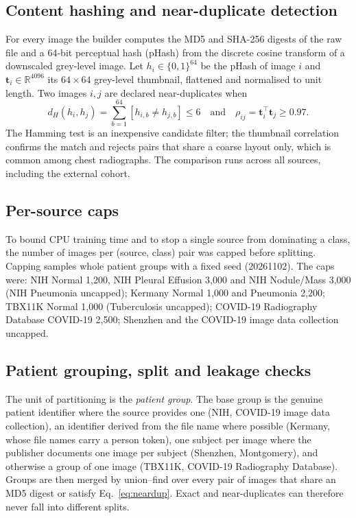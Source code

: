 \subsection{Content hashing and near-duplicate detection}
\label{sec:hashing}
For every image the builder computes the MD5 and SHA-256 digests of the raw file and a 64-bit perceptual hash (pHash) from the discrete cosine transform of a downscaled grey-level image. Let $h_i\in\{0,1\}^{64}$ be the pHash of image $i$ and $\mathbf{t}_i\in\mathbb{R}^{4096}$ its $64\times64$ grey-level thumbnail, flattened and normalised to unit length. Two images $i,j$ are declared near-duplicates when
\begin{equation}
d_H(h_i,h_j)=\sum_{b=1}^{64}\left[h_{i,b}\neq h_{j,b}\right]\le 6
\quad\text{and}\quad
\rho_{ij}=\mathbf{t}_i^{\top}\mathbf{t}_j\ge 0.97 .
\label{eq:neardup}
\end{equation}
The Hamming test is an inexpensive candidate filter; the thumbnail correlation confirms the match and rejects pairs that share a coarse layout only, which is common among chest radiographs. The comparison runs across all sources, including the external cohort.

\subsection{Per-source caps}
To bound CPU training time and to stop a single source from dominating a class, the number of images per (source, class) pair was capped before splitting. Capping samples whole patient groups with a fixed seed (20261102). The caps were: NIH Normal 1,200, NIH Pleural Effusion 3,000 and NIH Nodule/Mass 3,000 (NIH Pneumonia uncapped); Kermany Normal 1,000 and Pneumonia 2,200; TBX11K Normal 1,000 (Tuberculosis uncapped); COVID-19 Radiography Database COVID-19 2,500; Shenzhen and the COVID-19 image data collection uncapped.

\subsection{Patient grouping, split and leakage checks}
\label{sec:split}
The unit of partitioning is the \emph{patient group}. The base group is the genuine patient identifier where the source provides one (NIH, COVID-19 image data collection), an identifier derived from the file name where possible (Kermany, whose file names carry a person token), one subject per image where the publisher documents one image per subject (Shenzhen, Montgomery), and otherwise a group of one image (TBX11K, COVID-19 Radiography Database). Groups are then merged by union--find over every pair of images that share an MD5 digest or satisfy Eq.~\eqref{eq:neardup}. Exact and near-duplicates can therefore never fall into different splits.

